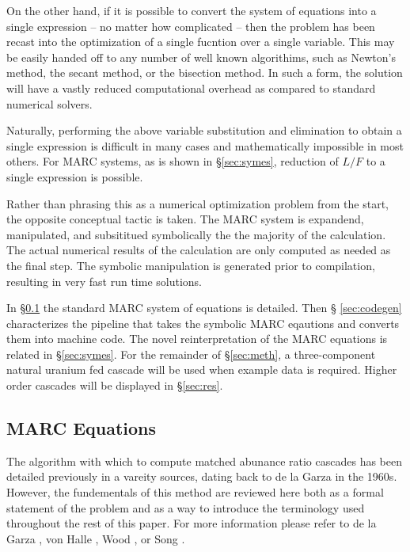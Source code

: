 \documentclass[preprint,12pt]{elsarticle}
\begin{document}
On the other hand, if it is possible to convert the system of equations 
into a single expression -- no matter how complicated -- then the problem has been 
recast into the optimization of a single fucntion over a single variable.   This 
may be easily handed off to any number of well known algorithims, such as Newton's
method, the secant method, or the bisection method.  In such a form, the solution 
will have a vastly reduced computational overhead as compared to standard 
numerical solvers. 

Naturally, performing the above variable substitution and elimination to obtain a 
single expression is difficult in many cases and mathematically impossible in most 
others.  For MARC systems, as is shown in \S \ref{sec:symes}, reduction of $L/F$
to a single expression is possible.

Rather than phrasing this as a numerical optimization problem from the start, the 
opposite conceptual tactic is taken.  The MARC system is expandend, manipulated, 
and subsititued symbolically the the majority of the calculation.  The actual 
numerical results of the calculation are only computed as needed as the final step.
The symbolic manipulation is generated prior to compilation, resulting in 
very fast run time solutions.

In \S \ref{sec:marceq} the standard MARC system of equations is detailed. Then \S 
\ref{sec:codegen} characterizes the pipeline that takes the symbolic MARC eqautions 
and converts them into machine code.  The novel reinterpretation of the MARC equations
is related in \S \ref{sec:symes}.  For the remainder of \S \ref{sec:meth}, a
three-component natural uranium fed cascade will be used when example data is required.
Higher order cascades will be displayed in \S \ref{sec:res}.

\subsection{MARC Equations}
\label{sec:marceq}
The algorithm with which to compute matched abunance ratio cascades has been 
detailed previously in a vareity sources, dating back to de la Garza in the
1960s. However, the fundementals of this method are reviewed here both as a formal
statement of the problem and as a way to introduce the terminology used throughout 
the rest of this paper.  For more information please refer to de la Garza
\cite{DelaGarza1969}, von Halle \cite{VonHalle1987}, Wood \cite{Wood1999}, or 
Song \cite{doi:10.1080/01496391003793884}.
\end{document}
